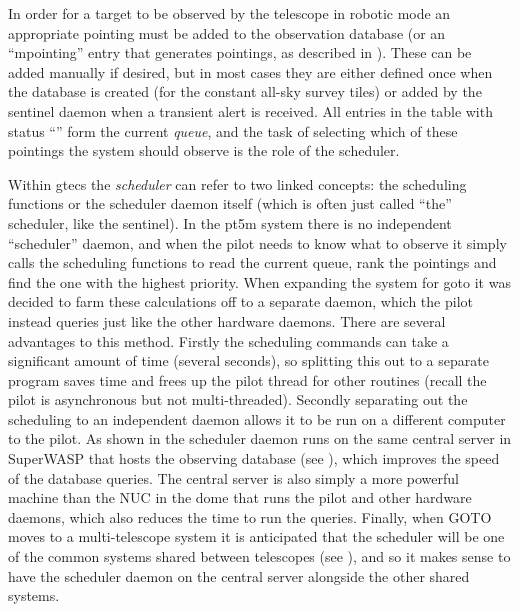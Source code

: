 \begin{colsection}
\begin{colsection}

In order for a target to be observed by the telescope in robotic mode an appropriate pointing must be added to the observation database (or an ``mpointing'' entry that generates pointings, as described in ). These can be added manually if desired, but in most cases they are either defined once when the database is created (for the constant all-sky survey tiles) or added by the sentinel daemon when a transient alert is received. All entries in the  table with status ``'' form the current \textit{queue}, and the task of selecting which of these pointings the system should observe is the role of the scheduler.

Within \gls{gtecs} the \textit{scheduler} can refer to two linked concepts: the scheduling functions or the scheduler daemon itself (which is often just called ``the'' scheduler, like the sentinel). In the \gls{pt5m} system there is no independent ``scheduler'' daemon, and when the pilot needs to know what to observe it simply calls the scheduling functions to read the current queue, rank the pointings and find the one with the highest priority. When expanding the system for \gls{goto} it was decided to farm these calculations off to a separate daemon, which the pilot instead queries just like the other hardware daemons. There are several advantages to this method. Firstly the scheduling commands can take a significant amount of time (several seconds), so splitting this out to a separate program saves time and frees up the pilot thread for other routines (recall the pilot is asynchronous but not multi-threaded). Secondly separating out the scheduling to an independent daemon allows it to be run on a different computer to the pilot. As shown in  the scheduler daemon runs on the same central server in SuperWASP that hosts the observing database (see ), which improves the speed of the database queries. The central server is also simply a more powerful machine than the NUC in the dome that runs the pilot and other hardware daemons, which also reduces the time to run the queries. Finally, when GOTO moves to a multi-telescope system it is anticipated that the scheduler will be one of the common systems shared between telescopes (see ), and so it makes sense to have the scheduler daemon on the central server alongside the other shared systems.


\end{colsection}
\end{colsection}
